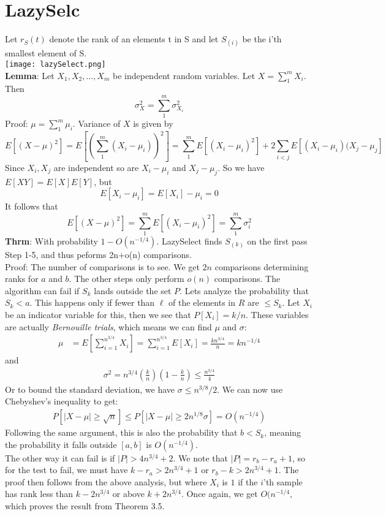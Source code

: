 \documentclass[a4paper]{article}
\begin{document}
\section{LazySelc}
Let \(r_S(t)\) denote the rank of an elements t in S and let \(S_{(i)}\) be the i'th smallest element of S.\\
\texttt{[image: lazySelect.png]}\\
\textbf{Lemma}: Let \(X_1,X_2,...,X_m\) be independent random variables. Let \(X = \sum_1^m X_i\). Then \[\sigma_X^2=\sum_{1}^m \sigma^2_{X_i}\]
Proof: \(\mu = \sum_1^m \mu_i\). Variance of \(X\) is given by
\[E[(X-\mu)^2] = E[(\sum_1^m(X_i- \mu_i))^2] = \sum_1^m E[(X_i - \mu_i)^2] + 2 \sum_{i<j} E[(X_i-\mu_i)(X_j-\mu_j]\]
Since \(X_i,X_j\) are independent so are \(X_i - \mu_i\) and \(X_j - \mu_j\). So we have \(E[XY] = E[X]E[Y]\), but 
\[E[X_i-\mu_i] = E[X_i] - \mu_i = 0\]
It follows that
\[E[(X-\mu)^2] = \sum_1^m E[(X_i - \mu_i)^2] = \sum_1^m \sigma^2_i\]
\textbf{Thrm}: With probability \(1-O(n^{-1/4})\). LazySelect finds \(S_{(k)}\) on the first pass Step 1-5, and thus peforms 2n+o(n) comparisons.\\
Proof: The number of comparisons is to see. We get $2n$ comparisons determining ranks for $a$ and $b$. The other steps only perform $o(n)$ comparisons. The algorithm can fail if $S_k$ lands outside the set $P$. Lets analyze the probability that $S_k<a$. This happens only if fewer than $\ell$ of the elements in $R$ are $\leq S_k$. Let $X_i$ be an indicator variable for this, then we see that $P[X_i]=k/n$. These variables are actually \textit{Bernouille trials}, which means we can find $\mu$ and $\sigma$:
\begin{align*}
  \mu&=E\left[ \sum_{i=1}^{n^{3/4}} X_i \right] = \sum_{i=1}^{n^{3/4}} E[X_i] =\frac{kn^{3/4}}{n}=kn^{-1/4}
\end{align*}
and
\begin{align*}
  \sigma^2 = n^{3/4}\left( \frac{k}{n} \right) \left( 1-\frac{k}{n} \right) \leq \frac{n^{3/4}}{4}
\end{align*}
Or to bound the standard deviation, we have $\sigma \leq n^{3/8}/2$. We can now use Chebyshev's inequality to get:
\begin{align*}
  P[|X-\mu|\geq \sqrt{n}]\leq P[|X-\mu|\geq 2n^{1/8}\sigma]=O(n^{-1/4})
\end{align*}
Following the same argument, this is also the probability that $b<S_k$, meaning the probability it falls outside $[a,b]$ is $O(n^{-1/4})$. \\
The other way it can fail is if $|P|>4n^{3/4}+2$. We note that $|P|=r_b-r_a+1$, so for the test to fail, we must have $k-r_a>2n^{3/4}+1$ or $r_b-k>2n^{3/4}+1$. The proof then follows from the above analysis, but where $X_i$ is $1$ if the $i$'th sample has rank less than $k-2n^{3/4}$ or above $k+2n^{3/4}$. Once again, we get $O(n^{-1/4}$, which proves the result from Theorem 3.5. \\
\end{document}
